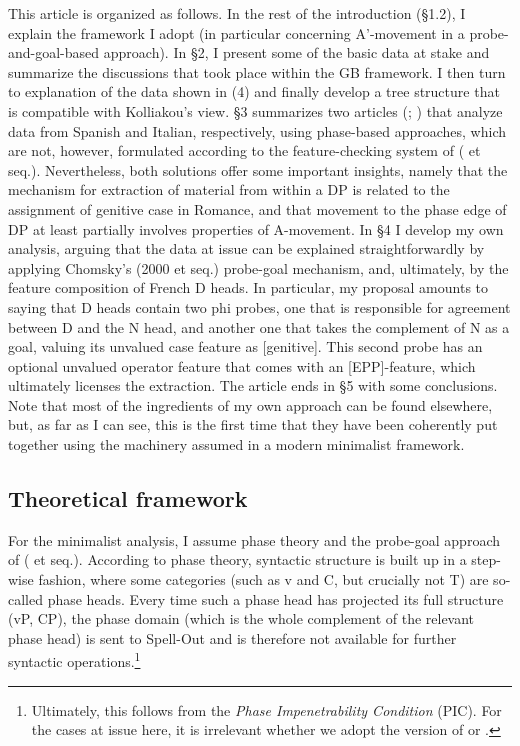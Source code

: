 \documentclass[output=paper]{langsci/langscibook}
\begin{document}
This article is organized as follows. In the rest of the introduction (§1.2), I explain the framework I adopt (in particular concerning A’-movement in a probe-and-goal-based approach). In §2, I present some of the basic data at stake and summarize the discussions that took place within the GB framework. I then turn to  explanation of the data shown in (4) and finally develop a tree structure that is compatible with Kolliakou’s view. §3 summarizes two articles (\citealt{Gutiérrez-Bravo2001}; \citealt{Cinque2014}) that analyze data from Spanish and Italian, respectively, using phase-based approaches, which are not, however, formulated according to the feature-checking system of \citeauthor{Chomsky2000} (\citeyear{Chomsky2000} et seq.). Nevertheless, both solutions offer some important insights, namely that the mechanism for extraction of material from within a DP is related to the assignment of genitive case in Romance, and that movement to the phase edge of DP at least partially involves properties of A-movement. In §4 I develop my own analysis, arguing that the data at issue can be explained straightforwardly by applying Chomsky’s (2000 et seq.) probe-goal mechanism, and, ultimately, by the feature composition of French D heads. In particular, my proposal amounts to saying that D heads contain two phi probes, one that is responsible for agreement between D and the N head, and another one that takes the complement of N as a goal, valuing its unvalued case feature as [genitive]. This second probe has an optional unvalued operator feature that comes with an [EPP]-feature, which ultimately licenses the extraction. The article ends in §5 with some conclusions. Note that most of the ingredients of my own approach can be found elsewhere, but, as far as I can see, this is the first time that they have been coherently put together using the machinery assumed in a modern minimalist framework.

\subsection{Theoretical framework}%

For the minimalist analysis, I assume phase theory and the probe-goal approach of \citeauthor{Chomsky2000} (\citeyear{Chomsky2000} et seq.). According to phase theory, syntactic structure is built up in a step-wise fashion, where some categories (such as v and C, but crucially not T) are so-called phase heads. Every time such a phase head has projected its full structure (vP, CP), the phase domain (which is the whole complement of the relevant phase head) is sent to Spell-Out and is therefore not available for further syntactic operations.\footnote{Ultimately, this follows from the \textit{Phase Impenetrability Condition} (PIC). For the cases at issue here, it is irrelevant whether we adopt the version of \citet[108]{Chomsky2000} or \citet[13–14]{Chomsky2001Derivation}.}
\end{document}
